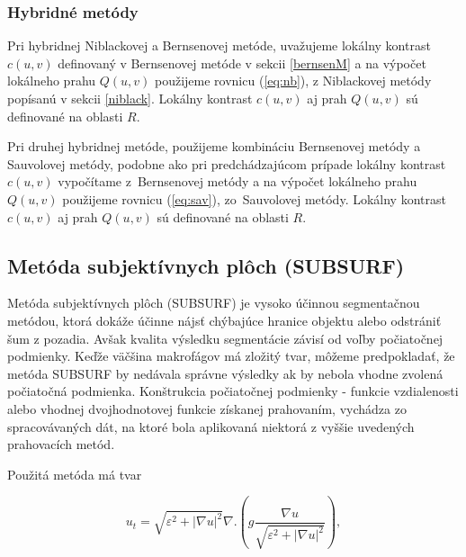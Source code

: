 \documentclass[a4paper,11pt,oneside]{article}%
\def\epsilon{\varepsilon}
\begin{document}

\subsubsection{Hybridné metódy}

Pri hybridnej Niblackovej a Bernsenovej metóde\cite{hybridNBaBren}, uvažujeme lokálny kontrast $c(u, v)$ definovaný v Bernsenovej metóde v sekcii \ref{bernsenM} a na výpočet lokálneho prahu $Q(u, v)$ použijeme rovnicu (\ref{eq:nb}), z Niblackovej metódy popísanú v sekcii \ref{niblack}. Lokálny kontrast $c(u, v)$ aj prah $Q(u, v)$ sú definované na oblasti $R$.

Pri druhej hybridnej metóde, použijeme kombináciu Bernsenovej metódy a Sauvolovej metódy\cite{hybridNBaBren}, podobne ako pri predchádzajúcom prípade lokálny kontrast $c(u, v)$ vypočítame z~Bernsenovej metódy a na výpočet lokálneho prahu $Q(u, v)$ použijeme rovnicu (\ref{eq:sav}), zo~Sauvolovej metódy. Lokálny kontrast $c(u, v)$ aj prah $Q(u, v)$ sú definované na oblasti $R$.

\subsection{Metóda subjektívnych plôch (SUBSURF)} 

Metóda subjektívnych plôch (SUBSURF) je vysoko účinnou segmentačnou metódou, ktorá dokáže účinne nájsť chýbajúce hranice objektu alebo odstrániť šum z pozadia. Avšak kvalita výsledku segmentácie závisí od voľby počiatočnej podmienky. Keďže väčšina makrofágov má zložitý tvar, môžeme predpokladať, že metóda SUBSURF by nedávala správne výsledky ak by nebola vhodne zvolená počiatočná podmienka. Konštrukcia počiatočnej podmienky - funkcie vzdialenosti alebo vhodnej dvojhodnotovej funkcie získanej prahovaním, vychádza zo spracovávaných   dát, na ktoré bola aplikovaná niektorá z vyššie uvedených prahovacích metód.

Použitá metóda má tvar

\begin{equation} \label{eq:subsurf}
u_t = \sqrt{\epsilon^2 + |\nabla u|^2}\nabla.\left(g \frac{\nabla u}{\sqrt{\epsilon^2 + |\nabla u|^2}}\right),
\end{equation}
\end{document}
